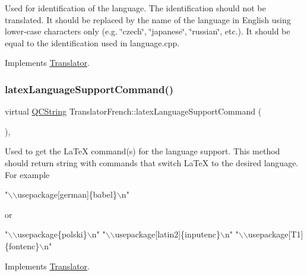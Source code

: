 Used for identification of the language. The identification should not be translated. It should be replaced by the name of the language in English using lower-\/case characters only (e.\+g. \char`\"{}czech\char`\"{}, \char`\"{}japanese\char`\"{}, \char`\"{}russian\char`\"{}, etc.). It should be equal to the identification used in language.\+cpp. 

Implements \mbox{\hyperlink{class_translator}{Translator}}.

\mbox{\label{class_translator_french_a844fb70f5f26360cf5c50902269ff87b}} 
\subsubsection{\texorpdfstring{latexLanguageSupportCommand()}{latexLanguageSupportCommand()}}
{\footnotesize\ttfamily virtual \mbox{\hyperlink{class_q_c_string}{Q\+C\+String}} Translator\+French\+::latex\+Language\+Support\+Command (\begin{DoxyParamCaption}{ }\end{DoxyParamCaption})\hspace{0.3cm}{\ttfamily [inline]}, {\ttfamily [virtual]}}

Used to get the La\+TeX command(s) for the language support. This method should return string with commands that switch La\+TeX to the desired language. For example 
\begin{DoxyPre}"\(\backslash\)\(\backslash\)usepackage[german]\{babel\}\(\backslash\)n"
\end{DoxyPre}
 or 
\begin{DoxyPre}"\(\backslash\)\(\backslash\)usepackage\{polski\}\(\backslash\)n"
"\(\backslash\)\(\backslash\)usepackage[latin2]\{inputenc\}\(\backslash\)n"
"\(\backslash\)\(\backslash\)usepackage[T1]\{fontenc\}\(\backslash\)n"
\end{DoxyPre}
 

Implements \mbox{\hyperlink{class_translator}{Translator}}.

\mbox{\label{class_translator_french_a11b0f4a660ad7c4ee5fd21766b239b56}} 
